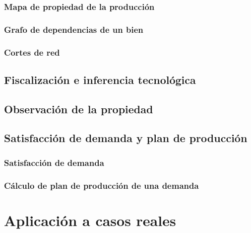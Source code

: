 \documentclass[11pt,spanish,letter]{article}
\begin{document}
   \subsubsection{Mapa de propiedad de la producción}

   \subsubsection{Grafo de dependencias de un bien}

   \subsubsection{Cortes de red}

  \subsection{Fiscalización e inferencia tecnológica}
  \label{fiscal:sec}

  \subsection{Observación de la propiedad}
  \label{monopolio:sec}
  \label{monopolios:sec}


  \subsection{Satisfacción de demanda y plan de producción}
  \label{demanda:sec}

   \subsubsection{Satisfacción de demanda}

   \subsubsection{Cálculo de plan de producción de una demanda}


   \section{Aplicación a casos reales}

   


 

 
\end{document}
